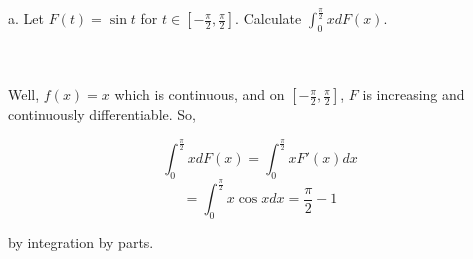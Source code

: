 a. Let $F(t)=\sin t$ for $t\in[-\frac{\pi}{2},\frac{\pi}{2}]$. Calculate
$\int_0^{\frac{\pi}{2}}xdF(x)$.\\\\

\begin{solution}\renewcommand{\qedsymbol}{}\ \\
    Well, $f(x)=x$ which is continuous, and on $[-\frac{\pi}{2},\frac{\pi}{2}]$, $F$ is increasing and
    continuously differentiable. So,
    
    $$\int_0^{\frac{\pi}{2}}xdF(x)=\int_0^{\frac{\pi}{2}}xF'(x)dx$$
    $$=\int_0^{\frac{\pi}{2}}x\cos xdx=\frac{\pi}{2}-1$$
    
    by integration by parts.

\end{solution}